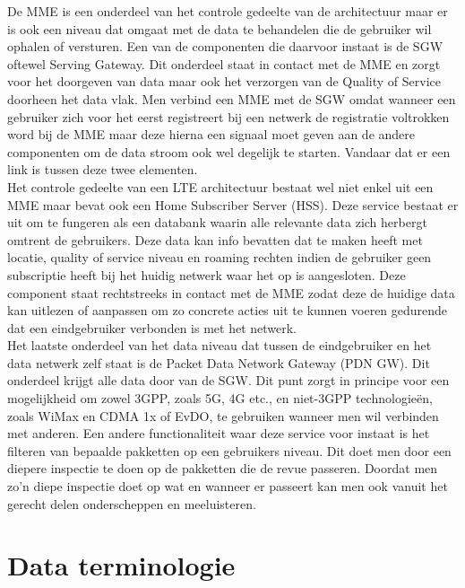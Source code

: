De MME is een onderdeel van het controle gedeelte van de architectuur maar er is ook een niveau dat omgaat met de data te behandelen die de gebruiker wil ophalen of versturen. Een van de componenten die daarvoor instaat is de SGW oftewel Serving Gateway. Dit onderdeel staat in contact met de MME en zorgt voor het doorgeven van data maar ook het verzorgen van de Quality of Service doorheen het data vlak. Men verbind een MME met de SGW omdat wanneer een gebruiker zich voor het eerst registreert bij een netwerk de registratie voltrokken word bij de MME maar deze hierna een signaal moet geven aan de andere componenten om de data stroom ook wel degelijk te starten. Vandaar dat er een link is tussen deze twee elementen. \autocite{Malla2014} \\

Het controle gedeelte van een LTE architectuur bestaat wel niet enkel uit een MME maar bevat ook een Home Subscriber Server (HSS). Deze service bestaat er uit om te fungeren als een databank waarin alle relevante data zich herbergt omtrent de gebruikers. Deze data kan info bevatten dat te maken heeft met locatie, quality of service niveau en roaming rechten indien de gebruiker geen subscriptie heeft bij het huidig netwerk waar het op is aangesloten. Deze component staat rechtstreeks in contact met de MME zodat deze de huidige data kan uitlezen of aanpassen om zo concrete acties uit te kunnen voeren gedurende dat een eindgebruiker verbonden is met het netwerk. \autocite{Shinde2020} \\

Het laatste onderdeel van het data niveau dat tussen de eindgebruiker en het data netwerk zelf staat is de Packet Data Network Gateway (PDN GW). Dit onderdeel krijgt alle data door van de SGW. Dit punt zorgt in principe voor een mogelijkheid om zowel 3GPP, zoals 5G, 4G etc., en niet-3GPP technologieën, zoals WiMax en CDMA 1x of EvDO,  te gebruiken wanneer men wil verbinden met anderen. Een andere functionaliteit waar deze service voor instaat is het filteren van bepaalde pakketten op een gebruikers niveau. Dit doet men door een diepere inspectie te doen op de pakketten die de revue passeren. Doordat men zo'n diepe inspectie doet op wat en wanneer er passeert kan men ook vanuit het gerecht delen onderscheppen en meeluisteren. \autocite{Gilbert2012}      

\section{Data terminologie}

